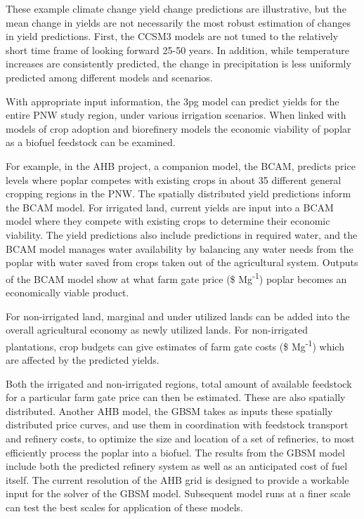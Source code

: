\documentclass[preprint,review,12pt]{elsarticle}
\begin{document}
These example climate change yield change predictions are
illustrative, but the mean change in yields are not necessarily the
most robust estimation of changes in yield predictions.  First, the
\ac{CCSM3} models are not tuned to the relatively short time frame of
looking forward 25-50 years.  In addition, while temperature increases
are consistently predicted, the change in precipitation is less
uniformly predicted among different models and scenarios. 

With appropriate input information, the \ac{3pg} model can predict
yields for the entire \ac{PNW} study region, under various irrigation
scenarios.  When linked with models of crop adoption and biorefinery
models the economic viability of poplar as a biofuel feedstock can be
examined.
 
For example, in the \ac{AHB} project, a companion model, the
\acf{BCAM}, predicts price levels where poplar competes with existing
crops in about 35 different general cropping regions in the \ac{PNW}.
The spatially distributed yield predictions inform the \ac{BCAM}
model.  For irrigated land, current yields are input into a \ac{BCAM}
model where they compete with existing crops to determine their
economic viability.  The yield predictions also include predictions in
required water, and the \ac{BCAM} model manages water availability by
balancing any water needs from the poplar with water saved from crops
taken out of the agricultural system.  Outputs of the \ac{BCAM} model
show at what farm gate price (\$ Mg\textsuperscript{-1}) poplar becomes an economically
viable product.
 
For non-irrigated land, marginal and under utilized lands can be added
into the overall agricultural economy as newly utilized lands.  For
non-irrigated plantations, crop budgets can give estimates of farm gate
costs (\$ Mg\textsuperscript{-1}) which are affected by the predicted yields.

Both the irrigated and non-irrigated regions, total amount of available
feedstock for a particular farm gate price can then be estimated.
These are also spatially distributed.  Another \ac{AHB} model, the
\acf{GBSM} takes as inputs these spatially distributed price curves,
 and use them in coordination with feedstock transport and refinery
costs, to optimize the size and location of a set of refineries, to
most efficiently process the poplar into a biofuel.  The results from
the \ac{GBSM} model include both the predicted refinery system as well
as an anticipated cost of fuel itself.  The current resolution of the
\ac{AHB} grid is designed to provide a workable input for the solver
of the \ac{GBSM} model.  Subsequent model runs at a finer scale can
test the best scales for application of these models.
\end{document}
